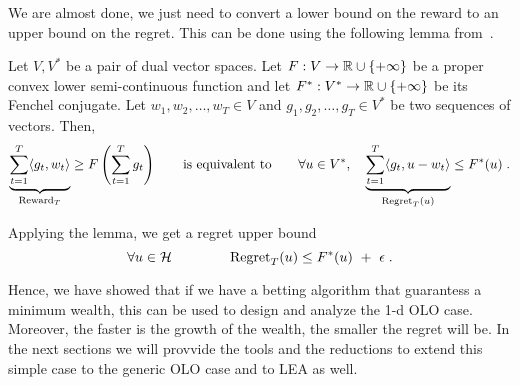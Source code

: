 We are almost done, we just need to convert a lower bound on the reward to an upper bound
on the regret. This can be done using the following lemma from~\cite{McMahanO14}.
\begin{lemma}
\label{lemma:reward-regret}
Let $V,V^*$ be a pair of dual vector spaces. Let $F:V \to \mathbb{R} \cup \{+\infty\}$
be a proper convex lower semi-continuous function and let $F^*:V^* \to \mathbb{R} \cup
\{+\infty\}$ be its Fenchel conjugate. Let $w_1, w_2, \dots, w_T \in V$ and
$g_1, g_2, \dots, g_T \in V^*$ be two sequences of vectors.  Then,
\[
\underbrace{\sum_{t=1}^T \langle g_t, w_t \rangle}_{\operatorname{Reward}_T} \ge F\left( \sum_{t=1}^T g_t \right)
\qquad \text{is equivalent to} \qquad
\forall u \in V^*, \quad
\underbrace{\sum_{t=1}^T \langle g_t, u - w_t\rangle}_{\operatorname{Regret}_T(u)} \le F^*(u) \; .
\]
\end{lemma}

Applying the lemma, we get a regret upper bound
\[
\forall u \in \mathcal{H} \qquad \qquad
\operatorname{Regret}_T(u) \le F^*(u) \ + \ \epsilon \; .
\]

Hence, we have showed that if we have a betting algorithm that guarantess a minimum wealth, this can be used to design and analyze the 1-d \ac{OLO} case. Moreover, the faster is the growth of the wealth, the smaller the regret will be.
In the next sections we will provvide the tools and the reductions to extend this simple case to the generic \ac{OLO} case and to \ac{LEA} as well.